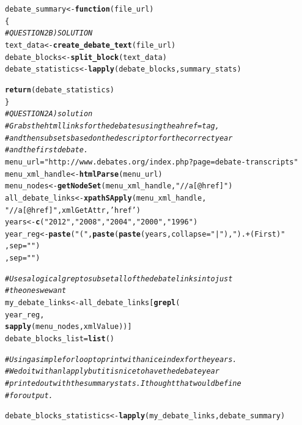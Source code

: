 \documentclass{article}\usepackage[]{graphicx}\usepackage[]{color}
\makeatletter
\newcommand{\hlstr}[1]{\textcolor[rgb]{0.192,0.494,0.8}{#1}}%
\newcommand{\hlcom}[1]{\textcolor[rgb]{0.678,0.584,0.686}{\textit{#1}}}%
\newcommand{\hlstd}[1]{\textcolor[rgb]{0.345,0.345,0.345}{#1}}%
\newcommand{\hlkwa}[1]{\textcolor[rgb]{0.161,0.373,0.58}{\textbf{#1}}}%
\newcommand{\hlkwb}[1]{\textcolor[rgb]{0.69,0.353,0.396}{#1}}%
\newcommand{\hlkwc}[1]{\textcolor[rgb]{0.333,0.667,0.333}{#1}}%
\newcommand{\hlkwd}[1]{\textcolor[rgb]{0.737,0.353,0.396}{\textbf{#1}}}%
\newenvironment{kframe}{%
 \def\at@end@of@kframe{}%
 \ifinner\ifhmode%
  \def\at@end@of@kframe{\end{minipage}}%
  \begin{minipage}{\columnwidth}%
 \fi\fi%
 \def\FrameCommand##1{\hskip\@totalleftmargin \hskip-\fboxsep
 \colorbox{shadecolor}{##1}\hskip-\fboxsep
     \hskip-\linewidth \hskip-\@totalleftmargin \hskip\columnwidth}%
 \MakeFramed {\advance\hsize-\width
   \@totalleftmargin\z@ \linewidth\hsize
   \@setminipage}}%
 {\par\unskip\endMakeFramed%
 \at@end@of@kframe}
\newenvironment{knitrout}{}{} %
\makeatother
\begin{document}
\begin{knitrout}
\begin{kframe}
\begin{alltt}
\hlstd{debate_summary} \hlkwb{<-} \hlkwa{function}\hlstd{(}\hlkwc{file_url}\hlstd{)}
\hlstd{\{}
  \hlcom{# QUESTION 2B) SOLUTION}
  \hlstd{text_data} \hlkwb{<-} \hlkwd{create_debate_text}\hlstd{(file_url)}
  \hlstd{debate_blocks} \hlkwb{<-} \hlkwd{split_block}\hlstd{(text_data)}
  \hlstd{debate_statistics} \hlkwb{<-} \hlkwd{lapply}\hlstd{(debate_blocks,summary_stats)}

  \hlkwd{return}\hlstd{(debate_statistics)}
\hlstd{\}}
\hlcom{# QUESTION 2A) solution}
\hlcom{# Grabs the html links for the debates using the a href= tag,}
\hlcom{# and then subsets based on the descriptor for the correct year}
\hlcom{# and the first debate.}
\hlstd{menu_url}\hlkwb{=}\hlstr{"http://www.debates.org/index.php?page=debate-transcripts"}
\hlstd{menu_xml_handle} \hlkwb{<-} \hlkwd{htmlParse}\hlstd{(menu_url)}
\hlstd{menu_nodes} \hlkwb{<-} \hlkwd{getNodeSet}\hlstd{(menu_xml_handle,}\hlstr{"//a[@href]"}\hlstd{)}
\hlstd{all_debate_links} \hlkwb{<-} \hlkwd{xpathSApply}\hlstd{(menu_xml_handle,}
                                \hlstr{"//a[@href]"}\hlstd{, xmlGetAttr,} \hlstr{'href'}\hlstd{)}
\hlstd{years} \hlkwb{<-} \hlkwd{c}\hlstd{(}\hlstr{"2012"}\hlstd{,}\hlstr{"2008"}\hlstd{,}\hlstr{"2004"}\hlstd{,}\hlstr{"2000"}\hlstd{,}\hlstr{"1996"}\hlstd{)}
\hlstd{year_reg} \hlkwb{<-} \hlkwd{paste}\hlstd{(}\hlstr{"("}\hlstd{,}\hlkwd{paste}\hlstd{(}\hlkwd{paste}\hlstd{(years,}\hlkwc{collapse}\hlstd{=}\hlstr{"|"}\hlstd{),}\hlstr{").+(First)"}
                            \hlstd{,}\hlkwc{sep}\hlstd{=}\hlstr{""}\hlstd{)}
                  \hlstd{,}\hlkwc{sep}\hlstd{=}\hlstr{""}\hlstd{)}

\hlcom{# Uses a logical grep to subset all of the debate links into just}
\hlcom{# the ones we want}
\hlstd{my_debate_links} \hlkwb{<-} \hlstd{all_debate_links[}\hlkwd{grepl}\hlstd{(}
  \hlstd{year_reg,}
  \hlkwd{sapply}\hlstd{(menu_nodes,xmlValue))]}
\hlstd{debate_blocks_list} \hlkwb{=} \hlkwd{list}\hlstd{()}

\hlcom{# Using a simple for loop to print with a nice index for the years.}
\hlcom{# We do it with an lapply but it is nice to have the debate year}
\hlcom{# printed out with the summary stats.  I thought that would be fine }
\hlcom{# for output.}

\hlstd{debate_blocks_statistics} \hlkwb{<-} \hlkwd{lapply}\hlstd{(my_debate_links,debate_summary)}
\end{alltt}


{\ttfamily\noindent\color{warningcolor}{\#\# Warning: closing unused connection 5 (http://www.debates.org/index.php?page=october-3-2012-debate-transcript)}}


\end{kframe}
\end{knitrout}
\end{document}
